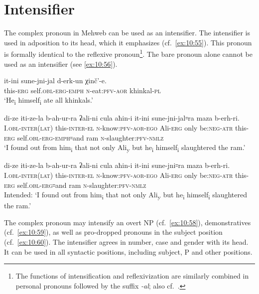 ﻿\documentclass[output=paper]{langsci/langscibook}
\begin{document}
\section{Intensifier}\label{intensifier}

The complex pronoun in Mehweb can be used as an intensifier. The
intensifier is used in adposition to its head, which it emphasizes (cf.\
\ref{ex:10:55}). This pronoun is formally identical to the reflexive
pronoun\footnote{The functions of intensification and reflexivization
  are similarly combined in personal pronouns followed by the suffix
  \emph{-al}; also cf.\ \tabref{tab:10:2}.}. The bare pronoun alone cannot be used as an
intensifier (see \ref{ex:10:56}).

\ea \label{ex:10:55} %
\gll  it-ini sune-jni-jal d-erk-un χinč'-e.\\
this-\textsc{erg} self.\textsc{obl}-\textsc{erg}-\textsc{emph} \textsc{n}-eat:\textsc{pfv}-\textsc{aor} khinkal-\textsc{pl}\\ 
\glt `He\textsubscript{i} himself\textsubscript{i} ate all khinkals.'

\ex \label{ex:10:56} %
\gll  di-ze iti-ze-la b-ah-ur-ra ʡali-ni cula aħin-i it-ini sune-jni-jal꞊ra maza b-erh-ri.\\
I.\textsc{obl}-\textsc{inter}(\textsc{lat}) this-\textsc{inter}-\textsc{el} \textsc{n}-know:\textsc{pfv}-\textsc{aor}-\textsc{ego} Ali-\textsc{erg} only {be}:\textsc{neg}-\textsc{atr} this-\textsc{erg} self.\textsc{obl}-\textsc{erg}-\textsc{emph}꞊and ram \textsc{n}-slaughter:\textsc{pfv}-\textsc{nmlz}\\ 
\glt `I found out from him\textsubscript{i} that not only
Ali\textsubscript{y} but he\textsubscript{i} himself\textsubscript{i}
slaughtered the ram.'

\ex %
\gll  *di-ze iti-ze-la b-ah-ur-ra ʡali-ni cula aħin-i it-ini sune-jni꞊ra maza b-erh-ri.\\
I.\textsc{obl}-\textsc{inter}(\textsc{lat}) this-\textsc{inter}-\textsc{el} \textsc{n}-know:\textsc{pfv}-\textsc{aor}-\textsc{ego} Ali-\textsc{erg} only {be}:\textsc{neg}-\textsc{atr} this-\textsc{erg} self.\textsc{obl}-\textsc{erg}꞊and ram \textsc{n}-slaughter:\textsc{pfv}-\textsc{nmlz}\\
\glt Intended: `I found out from him\textsubscript{i} that not only
Ali\textsubscript{y} but he\textsubscript{i} himself\textsubscript{i}
slaughtered the ram.'
\z

The complex pronoun may intensify an overt NP (cf.\ \ref{ex:10:58}), demonstratives
(cf.\ \ref{ex:10:59}), as well as pro-dropped pronouns in the subject position (cf.\
\ref{ex:10:60}). The intensifier agrees in number, case and gender with its head. It can
be used in all syntactic positions, including subject, P and other
positions.
\end{document}
